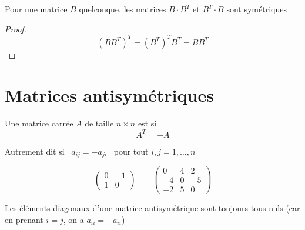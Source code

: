 
\begin{frame}
\begin{exemple}
Pour une matrice $B$ quelconque, les matrices $B \cdot B^T$ et $B^T \cdot B$ sont symétriques   
\end{exemple}

\bigskip
\pause

\begin{proof}
\[
(BB^T)^T = (B^T)^T B^T = BB^T 
\]
\end{proof}
\end{frame}


\section{Matrices antisymétriques}

\begin{frame}
\begin{mydefinition}
Une matrice carrée $A$ de taille $n \times n$ est  si
$$A^T = -A$$
\end{mydefinition}
\pause
Autrement dit  si \ $a_{ij} = -a_{ji}$ \ pour tout $i,j=1, \ldots, n$

\pause %

\bigskip

\begin{exemple}
$$\begin{pmatrix}
0 & -1\\
1 & 0     
\end{pmatrix} \qquad 
\begin{pmatrix}
0 & 4 & 2\\
-4 & 0 & -5\\
-2 & 5 & 0  
\end{pmatrix}$$  
\end{exemple} 

\pause %

\bigskip
Les éléments diagonaux d'une matrice antisymétrique sont toujours tous nuls
(car en prenant $i=j$, on a $a_{ii} = - a_{ii}$)

\end{frame}


